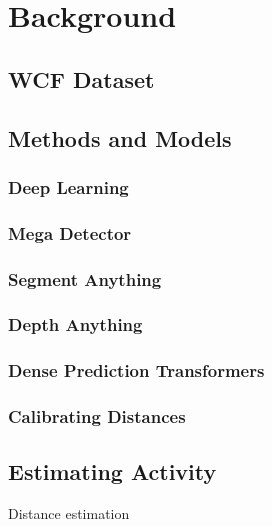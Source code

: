 \section{Background}

\subsection{WCF Dataset}

\subsection{Methods and Models}
\subsubsection{Deep Learning}
\subsubsection{Mega Detector}
\subsubsection{Segment Anything}
\subsubsection{Depth Anything}
\subsubsection{Dense Prediction Transformers}
\subsubsection{Calibrating Distances}

\subsection{Estimating Activity}

Distance estimation\cite{HAUCKE2022101536}